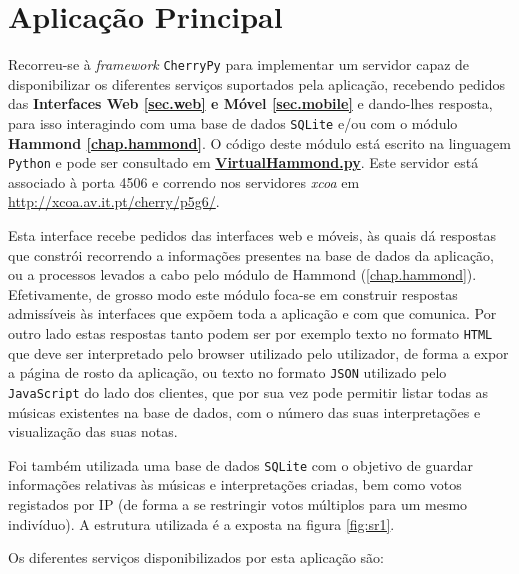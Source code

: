 \documentclass[a4paper,11pt,openright,oneside]{report}
\begin{document}
\chapter{Aplicação Principal}
\label{chap.mainapp}

Recorreu-se à \textit{framework} \verb|CherryPy| para implementar um servidor capaz de disponibilizar os diferentes serviços suportados pela aplicação, recebendo pedidos das \textbf{Interfaces Web \autoref{sec.web} e Móvel \ref{sec.mobile}} e dando-lhes resposta, para isso interagindo com uma base de dados \verb|SQLite| e/ou com o módulo \textbf{Hammond \ref{chap.hammond}}. O código deste módulo está escrito na linguagem \verb|Python| e pode ser consultado em \href{../../MainApp/VirtualHammond.py}{\textbf{VirtualHammond.py}}. Este servidor está associado à porta 4506 e correndo nos servidores \textit{xcoa} em \url{http://xcoa.av.it.pt/cherry/p5g6/}.

Esta interface recebe pedidos das interfaces web e móveis, às quais dá respostas que constrói recorrendo a informações presentes na base de dados da aplicação, ou a processos levados a cabo pelo módulo de Hammond (\ref{chap.hammond}). Efetivamente, de grosso modo este módulo foca-se em construir respostas admissíveis às interfaces que expõem toda a aplicação e com que comunica. Por outro lado estas respostas tanto podem ser por exemplo texto no formato \verb|HTML| que deve ser interpretado pelo browser utilizado pelo utilizador, de forma a expor a página de rosto da aplicação, ou texto no formato \verb|JSON| utilizado pelo \verb|JavaScript| do lado dos clientes, que por sua vez pode permitir listar todas as músicas existentes na base de dados, com o número das suas interpretações e visualização das suas notas.

Foi também utilizada uma base de dados \verb|SQLite| com o objetivo de guardar informações relativas às músicas e interpretações criadas, bem como votos registados por IP (de forma a se restringir votos múltiplos para um mesmo indivíduo). A estrutura utilizada é a exposta na figura \ref{fig:sr1}.

Os diferentes serviços disponibilizados por esta aplicação são:
\end{document}
